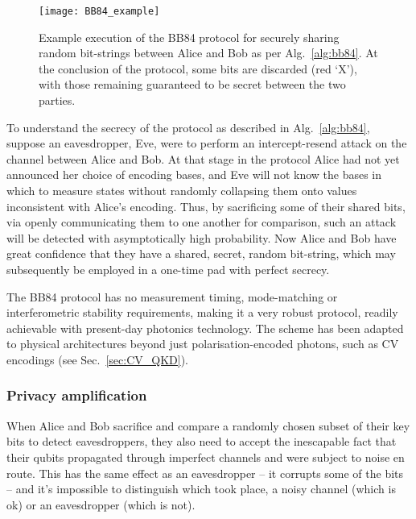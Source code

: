 \begin{figure}[!htbp]
\texttt{[image: BB84\_example]}
\captionspacefig \caption{Example execution of the BB84 protocol for securely sharing random bit-strings between Alice and Bob as per Alg.~\ref{alg:bb84}. At the conclusion of the protocol, some bits are discarded (red `X'), with those remaining guaranteed to be secret between the two parties.} \label{fig:BB84_example}	
\end{figure}

To understand the secrecy of the protocol as described in Alg.~\ref{alg:bb84}, suppose an eavesdropper, Eve, were to perform an intercept-resend attack on the channel between Alice and Bob. At that stage in the protocol Alice had not yet announced her choice of encoding bases, and Eve will not know the bases in which to measure states without randomly collapsing them onto values inconsistent with Alice's encoding. Thus, by sacrificing some of their shared bits, via openly communicating them to one another for comparison, such an attack will be detected with asymptotically high probability. Now Alice and Bob have great confidence that they have a shared, secret, random bit-string, which may subsequently be employed in a one-time pad with perfect secrecy.

The BB84 protocol has no measurement timing, mode-matching or interferometric stability requirements, making it a very robust protocol, readily achievable with present-day photonics technology. The scheme has been adapted to physical architectures beyond just polarisation-encoded photons, such as CV encodings (see Sec.~\ref{sec:CV_QKD}).

%
%

\subsubsection{Privacy amplification}

When Alice and Bob sacrifice and compare a randomly chosen subset of their key bits to detect eavesdroppers, they also need to accept the inescapable fact that their qubits propagated through imperfect channels and were subject to noise en route. This has the same effect as an eavesdropper -- it corrupts some of the bits -- and it's impossible to distinguish which took place, a noisy channel (which is ok) or an eavesdropper (which is not).

